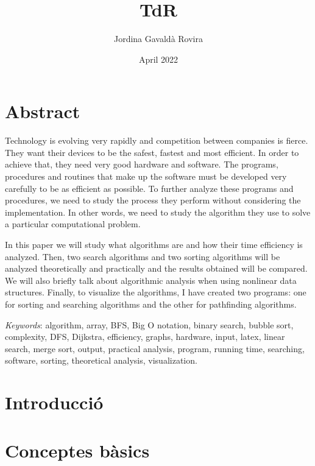 \documentclass[12pt, a4paper, oneside]{report}
\title{TdR}
\author{Jordina Gavaldà Rovira}
\date{April 2022}
\begin{document}



\pagestyle{empty}
\tableofcontents
{}

\newpage

\pagestyle{fancy}

\listoffigures

\chapter*{Abstract}
Technology is evolving very rapidly and competition between companies is fierce. They want their devices to be the safest, fastest and most efficient. In order to achieve that, they need very good hardware and software. The programs, procedures and routines that make up the software must be developed very carefully to be as efficient as possible. To further analyze these programs and procedures, we need to study the process they perform without considering the implementation. In other words, we need to study the algorithm they use to solve a particular computational problem.

In this paper we will study what algorithms are and how their time efficiency is analyzed. Then, two search algorithms and two sorting algorithms will be analyzed theoretically and practically and the results obtained will be compared. We will also briefly talk about algorithmic analysis when using nonlinear data structures. Finally, to visualize the algorithms, I have created two programs: one for sorting and searching algorithms and the other for pathfinding algorithms.

\textit{Keywords}: algorithm, array, BFS, Big O notation, binary search, bubble sort, complexity, DFS, Dijkstra, efficiency, graphs, hardware, input, latex, linear search, merge sort, output, practical analysis, program, running time, searching, software, sorting, theoretical analysis, visualization.

\chapter*{Introducció}


\setcounter{chapter}{0}
\chapter{Conceptes bàsics} 
\end{document}
